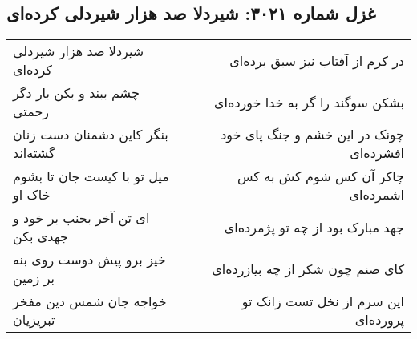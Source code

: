 \begin{center}
\section*{غزل شماره ۳۰۲۱: شیردلا صد هزار شیردلی کرده‌ای}
\label{sec:3021}
\begin{longtable}{l p{0.5cm} r}
شیردلا صد هزار شیردلی کرده‌ای
&&
در کرم از آفتاب نیز سبق برده‌ای
\\
چشم ببند و بکن بار دگر رحمتی
&&
بشکن سوگند را گر به خدا خورده‌ای
\\
بنگر کاین دشمنان دست زنان گشته‌اند
&&
چونک در این خشم و جنگ پای خود افشرده‌ای
\\
میل تو با کیست جان تا بشوم خاک او
&&
چاکر آن کس شوم کش به کس اشمرده‌ای
\\
ای تن آخر بجنب بر خود و جهدی بکن
&&
جهد مبارک بود از چه تو پژمرده‌ای
\\
خیز برو پیش دوست روی بنه بر زمین
&&
کای صنم چون شکر از چه بیازرده‌ای
\\
خواجه جان شمس دین مفخر تبریزیان
&&
این سرم از نخل تست زانک تو پرورده‌ای
\\
\end{longtable}
\end{center}

